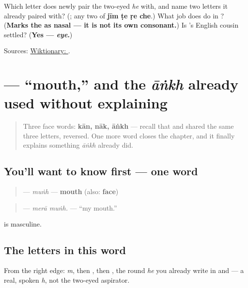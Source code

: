 \begin{tcolorbox}[breakable,colback=teal!4,colframe=teal!35!black,title={Before you move on}]
Which letter does \textbf{} newly pair the two-eyed \emph{he} with, and name two letters it already paired with? (\textbf{}; any two of \textbf{jīm ṭe ṛe che}.) What job does \textbf{} do in \textbf{}? (\textbf{Marks the  as nasal — it is not its own consonant.}) Is \textbf{}'s English cousin settled? (\textbf{Yes — \emph{eye}.})

Sources: \href{https://en.wiktionary.org/wiki/\%D8\%A2\%D9\%86\%DA\%A9\%DA\%BE}{Wiktionary: }.
\end{tcolorbox}
\section[\texorpdfstring{\ur{منہ} (muṅh)}{منہ (muṅh)}]{ — \textquotedblleft{}mouth,\textquotedblright{} and the  \emph{āṅkh} already used without explaining}

\label{lesson:UR-C10-munh}



\begin{quote}
Three face words: \textbf{kān, nāk, āṅkh} — recall that \textbf{} and \textbf{} shared the same three letters, reversed. One more word closes the chapter, and it finally explains something \emph{āṅkh} already did.
\end{quote}

\subsection*{You'll want to know first — one word}
\begin{quote}
\textbf{} — \emph{muṅh} — \textbf{mouth} (also: \textbf{face})
\end{quote}

\begin{quote}
\textbf{ } — \emph{merā muṅh.} — \textquotedblleft{}my mouth.\textquotedblright{}
\end{quote}

\textbf{} is masculine.

\subsection*{The letters in this word}
From the right edge: \textbf{} \emph{m}, then \textbf{}, then \textbf{}, the round \emph{he} you already write in \textbf{} and \textbf{} — a real, spoken \emph{h}, not the two-eyed aspirator.

